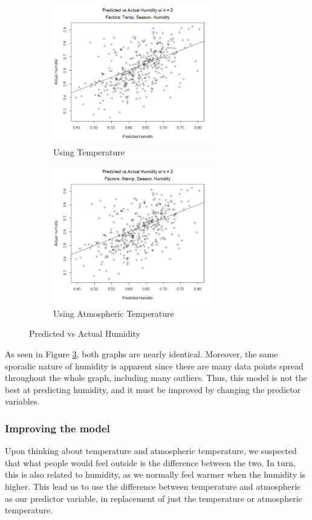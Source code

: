 \documentclass[12pt]{article}
\begin{document}
\begin{figure} [H]
\centering
\begin{subfigure}{.5\textwidth}
  \centering
  \includegraphics[width=70mm]{TvsH.png}
  \caption{Using Temperature}
  \label{fig:tvh}
\end{subfigure}%
\begin{subfigure}{.5\textwidth}
  \centering
  \includegraphics[width=70mm]{ATvsH.png}
  \caption{Using Atmospheric Temperature}
  \label{fig:atvh}
\end{subfigure}
\caption{Predicted vs Actual Humidity}
\label{fig:tempvsh}
\end{figure}

As seen in Figure \ref{fig:tempvsh}, both graphs are nearly identical. Moreover, the same sporadic nature of humidity is apparent since there are many data points spread throughout the whole graph, including many outliers. Thus, this model is not the best at predicting humidity, and it must be improved by changing the predictor variables.

\subsubsection{Improving the model}

Upon thinking about temperature and atmospheric temperature, we suspected that what people would feel outside is the difference between the two. In turn, this is also related to humidity, as we normally feel warmer when the humidity is higher. This lead us to use the difference between temperature and atmospheric as our predictor variable, in replacement of just the temperature or atmospheric temperature.
\end{document}
